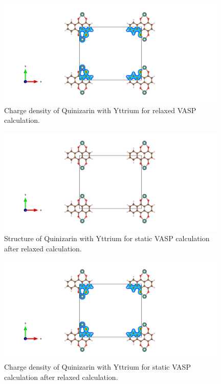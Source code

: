 \documentclass{article}
\begin{document}
  \begin{figure}[H]
      \centering
      \includegraphics[width = 11cm]{../fig/Y_relax_CHGCAR.png}
      \caption{Charge density of Quinizarin with Yttrium for relaxed VASP calculation. }
      \label{fig:Y_relax_CHGCAR}
  \end{figure}

  \begin{figure}[H]
      \centering
      \includegraphics[width = 11cm]{../fig/Y_staticafter_CONTCAR.png}
      \caption{Structure of Quinizarin with Yttrium for static VASP calculation after relaxed calculation. }
      \label{fig:Y_staticafter_CONTCAR}
  \end{figure}

  \begin{figure}[H]
      \centering
      \includegraphics[width = 11cm]{../fig/Y_staticafter_CHGCAR.png}
      \caption{Charge density of Quinizarin with Yttrium for static VASP calculation after relaxed calculation. }
      \label{fig:Y_staticafter_CHGCAR}
  \end{figure}
\end{document}
